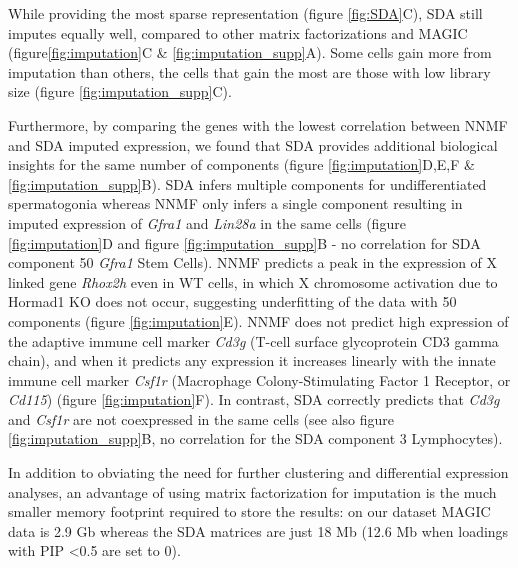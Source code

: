 While providing the most sparse representation (figure \ref{fig:SDA}C), SDA still imputes equally well, compared to other matrix factorizations and MAGIC \parencite{vanDijk2018Recovering} (figure\ref{fig:imputation}C \& \ref{fig:imputation_supp}A). Some cells gain more from imputation than others, the cells that gain the most are those with low library size (figure \ref{fig:imputation_supp}C).

Furthermore, by comparing the genes with the lowest correlation between NNMF and SDA imputed expression, we found that SDA provides additional biological insights for the same number of components (figure \ref{fig:imputation}D,E,F \& \ref{fig:imputation_supp}B). SDA infers multiple components for undifferentiated spermatogonia whereas NNMF only infers a single component resulting in imputed expression of \textit{Gfra1} and \textit{Lin28a} in the same cells (figure \ref{fig:imputation}D and figure \ref{fig:imputation_supp}B - no correlation for SDA component 50 \textit{Gfra1} Stem Cells). NNMF predicts a peak in the expression of X linked gene \textit{Rhox2h} even in WT cells, in which X chromosome activation due to Hormad1 KO does not occur, suggesting underfitting of the data with 50 components (figure \ref{fig:imputation}E). NNMF does not predict high expression of the adaptive immune cell marker \textit{Cd3g} (T-cell surface glycoprotein CD3 gamma chain), and when it predicts any expression it increases linearly with the innate immune cell marker \textit{Csf1r} (Macrophage Colony-Stimulating Factor 1 Receptor, or \textit{Cd115}) (figure \ref{fig:imputation}F). In contrast, SDA correctly predicts that \textit{Cd3g} and \textit{Csf1r} are not coexpressed in the same cells (see also figure \ref{fig:imputation_supp}B, no correlation for the SDA component 3 Lymphocytes).

In addition to obviating the need for further clustering and differential expression analyses, an advantage of using matrix factorization for imputation is the much smaller memory footprint required to store the results: on our dataset MAGIC data is 2.9 Gb whereas the SDA matrices are just 18 Mb (12.6 Mb when loadings with PIP <0.5 are set to 0).


